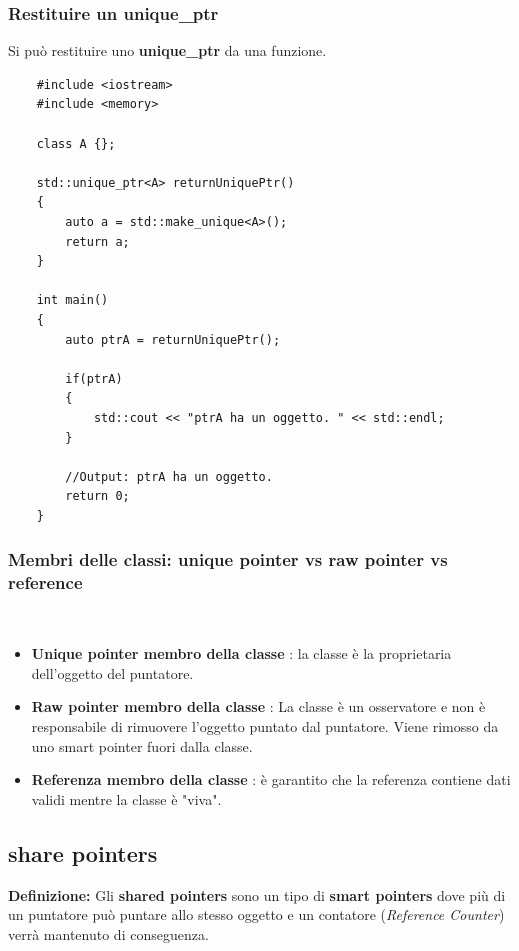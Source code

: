 \subsubsection{Restituire un unique\_ptr}

\textsf{\small Si può restituire uno \textbf{unique\_ptr} da una funzione. } \\

\begin{lstlisting}
	#include <iostream>
	#include <memory>
	
	class A {};
	
	std::unique_ptr<A> returnUniquePtr()
	{
		auto a = std::make_unique<A>();
		return a;
	}

	int main()
	{
		auto ptrA = returnUniquePtr();
		
		if(ptrA)
		{
			std::cout << "ptrA ha un oggetto. " << std::endl;	
		}
	
		//Output: ptrA ha un oggetto.
		return 0;
	}
\end{lstlisting}

\subsubsection{Membri delle classi: unique pointer vs raw pointer vs reference}

\textsf{\small } \\

\begin{itemize}
	\item \textsf{\small \textbf{Unique pointer membro della classe} : la classe è la proprietaria dell'oggetto del puntatore.}
	\item \textsf{\small \textbf{Raw pointer membro della classe} : La classe è un osservatore e non è responsabile di rimuovere l'oggetto puntato dal puntatore. Viene rimosso da uno smart pointer fuori dalla classe.}
	\item \textsf{\small \textbf{Referenza membro della classe} : è garantito che la referenza contiene dati validi mentre la classe è "viva".}
\end{itemize}

\subsection{share pointers}

\textsf{\small \textbf{Definizione: } Gli \textbf{shared pointers} sono un tipo di \textbf{smart pointers} dove più di un puntatore può puntare allo stesso oggetto e un contatore (\emph{Reference Counter}) verrà mantenuto di conseguenza.} \\


